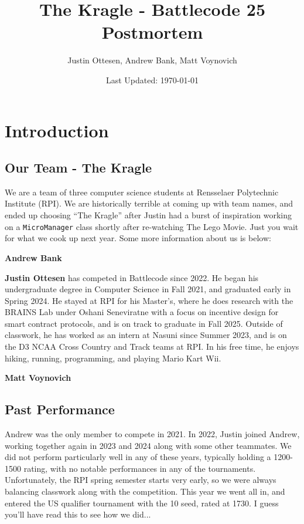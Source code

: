 \documentclass{article}
\title{The Kragle - Battlecode 25 Postmortem}
\author{Justin Ottesen, Andrew Bank, Matt Voynovich}
\date{Last Updated: \today}
\begin{document}
  \maketitle

  \section{Introduction}  

  \subsection{Our Team - The Kragle}

  We are a team of three computer science students at Rensselaer Polytechnic Institute (RPI). We are historically terrible at coming up with team names, and ended up choosing ``The Kragle'' after Justin had a burst of inspiration working on a \verb|MicroManager| class shortly after re-watching The Lego Movie. Just you wait for what we cook up next year. Some more information about us is below:
  
  \medskip

  \textbf{Andrew Bank} 

  \medskip

  \textbf{Justin Ottesen} has competed in Battlecode since 2022. He began his undergraduate degree in Computer Science in Fall 2021, and graduated early in Spring 2024. He stayed at RPI for his Master's, where he does research with the BRAINS Lab under Oshani Seneviratne with a focus on incentive design for smart contract protocols, and is on track to graduate in Fall 2025. Outside of classwork, he has worked as an intern at Nasuni since Summer 2023, and is on the D3 NCAA Cross Country and Track teams at RPI. In his free time, he enjoys hiking, running, programming, and playing Mario Kart Wii.

  \medskip

  \textbf{Matt Voynovich}

  \subsection{Past Performance}

  Andrew was the only member to compete in 2021. In 2022, Justin joined Andrew, working together again in 2023 and 2024 along with some other teammates. We did not perform particularly well in any of these years, typically holding a 1200-1500 rating, with no notable performances in any of the tournaments. Unfortunately, the RPI spring semester starts very early, so we were always balancing classwork along with the competition. This year we went all in, and entered the US qualifier tournament with the 10 seed, rated at 1730. I guess you'll have read this to see how we did...
\end{document}

